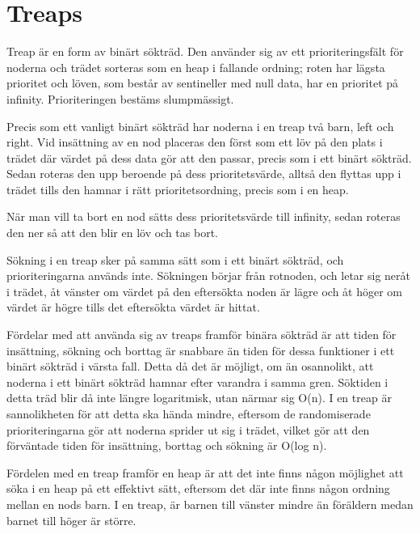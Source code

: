 \documentclass[a5paper,10pt,oneside]{article}
\begin{document}
\section{Treaps}

Treap är en form av binärt sökträd. Den använder sig av ett prioriteringsfält för noderna och trädet sorteras som en heap i fallande ordning; roten har lägsta prioritet och löven, som består av sentineller med null data, har en prioritet på infinity. Prioriteringen bestäms slumpmässigt.

Precis som ett vanligt binärt sökträd har noderna i en treap två barn, left och right. Vid insättning av en nod placeras den först som ett löv på den plats i trädet där värdet på dess data gör att den passar, precis som i ett binärt sökträd. Sedan roteras den upp beroende på dess prioritetsvärde, alltså den flyttas upp i trädet tills den hamnar i rätt prioritetsordning, precis som i en heap.

När man vill ta bort en nod sätts dess prioritetsvärde till infinity, sedan roteras den ner så att den blir en löv och tas bort.

Sökning i en treap sker på samma sätt som i ett binärt sökträd, och prioriteringarna används inte. Sökningen börjar från rotnoden, och letar sig neråt i trädet, åt vänster om värdet på den eftersökta noden är lägre och åt höger om värdet är högre tills det eftersökta värdet är hittat. 

Fördelar med att använda sig av treaps framför binära sökträd är att tiden för insättning, sökning och borttag är snabbare än tiden för dessa funktioner i ett binärt sökträd i värsta fall. Detta då det är möjligt, om än osannolikt, att noderna i ett binärt sökträd hamnar efter varandra i samma gren. Söktiden i detta träd blir då inte längre logaritmisk, utan närmar sig  O(n). I en treap är sannolikheten för att detta ska hända mindre, eftersom de randomiserade prioriteringarna gör att noderna sprider ut sig i trädet, vilket gör att den förväntade tiden för insättning, borttag och sökning är O(log n). 

Fördelen med en treap framför en heap är att det inte finns någon möjlighet att söka i en heap på ett effektivt sätt, eftersom det där inte finns någon ordning mellan en nods barn. I en treap, är barnen till vänster mindre än föräldern medan barnet till höger är större. 
\end{document}
